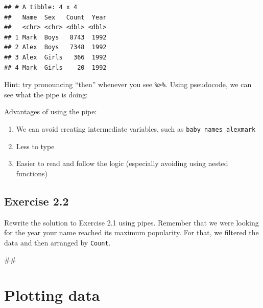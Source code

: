 \documentclass[]{book}
\newenvironment{Shaded}{\begin{snugshade}}{\end{snugshade}}
\newcommand{\KeywordTok}[1]{\textcolor[rgb]{0.13,0.29,0.53}{\textbf{#1}}}
\newcommand{\StringTok}[1]{\textcolor[rgb]{0.31,0.60,0.02}{#1}}
\newcommand{\CommentTok}[1]{\textcolor[rgb]{0.56,0.35,0.01}{\textit{#1}}}
\newcommand{\OperatorTok}[1]{\textcolor[rgb]{0.81,0.36,0.00}{\textbf{#1}}}
\newcommand{\NormalTok}[1]{#1}
\providecommand{\tightlist}{%
  \setlength{\itemsep}{0pt}\setlength{\parskip}{0pt}}
\begin{document}
\begin{verbatim}
## # A tibble: 4 x 4
##   Name  Sex   Count  Year
##   <chr> <chr> <dbl> <dbl>
## 1 Mark  Boys   8743  1992
## 2 Alex  Boys   7348  1992
## 3 Alex  Girls   366  1992
## 4 Mark  Girls    20  1992
\end{verbatim}

Hint: try pronouncing ``then'' whenever you see
\texttt{\%\textgreater{}\%}. Using pseudocode, we can see what the pipe
is doing:

\begin{Shaded}
\end{Shaded}

Advantages of using the pipe:

\begin{enumerate}
\def\labelenumi{\arabic{enumi}.}
\tightlist
\item
  We can avoid creating intermediate variables, such as
  \texttt{baby\_names\_alexmark}
\item
  Less to type
\item
  Easier to read and follow the logic (especially avoiding using nested
  functions)
\end{enumerate}

\subsection{Exercise 2.2}\label{exercise-2.2}

Rewrite the solution to Exercise 2.1 using pipes. Remember that we were
looking for the year your name reached its maximum popularity. For that,
we filtered the data and then arranged by \texttt{Count}.

\begin{Shaded}
\begin{Highlighting}[]
\NormalTok{##}
\end{Highlighting}
\end{Shaded}

\section{Plotting data}\label{plotting-data}
\end{document}
